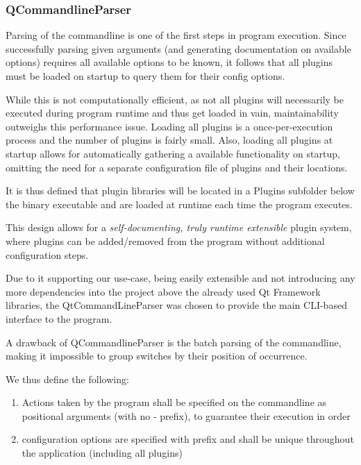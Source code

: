 
\subsubsection{QCommandlineParser}
Parsing of the commandline is one of the first steps in program execution. Since successfully parsing given arguments (and generating  documentation on available options) requires all available options to be known, it follows that all plugins must be loaded on startup to query them for their config options.

While this is not computationally efficient, as not all plugins will necessarily be executed during program runtime and thus get loaded in vain, maintainability outweighs this performance issue.
Loading all plugins is a once-per-execution process and the number of plugins is fairly small. Also, loading all plugins at startup allows for automatically gathering a available functionality on startup, omitting the need for a separate configuration file of plugins and their locations.

It is thus defined that plugin libraries will be located in a Plugins subfolder below the binary executable and are loaded at runtime each time the program executes.

This design allows for a \emph{self-documenting, truly runtime extensible} plugin system, where plugins can be added/removed from the program without additional configuration steps.

Due to it supporting our use-case, being easily extensible and not introducing any more dependencies into the project above the already used Qt Framework libraries, the QtCommandLineParser was chosen to provide the main CLI-based interface to the program.

A drawback of QCommandlineParser is the batch parsing of the commandline, making it impossible to group \-\-switches by their position of occurrence.

We thus define the following:
\begin{enumerate}
	\item Actions taken by the program shall be specified on the commandline as positional arguments (with no - prefix), to guarantee their execution in order
	\item configuration options are specified with \-\-prefix and shall be unique throughout the application (including all plugins)
\end{enumerate}

